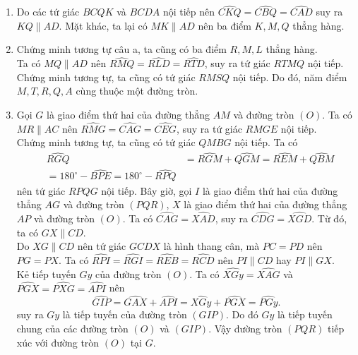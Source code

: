 \begin{ex}
{\begin{center}
		\end{center}
	\begin{enumerate}
		\item Do các tứ giác $BCQK$ và $BCDA$ nội tiếp nên $\widehat{CKQ}=\widehat{CBQ}=\widehat{CAD}$ suy ra $KQ\parallel AD$. Mặt khác, ta lại có $MK\parallel AD$ nên ba điểm $K,M,Q$ thẳng hàng.
		\item Chứng minh tương tự câu a, ta cũng có ba điểm $R,M,L$ thẳng hàng.\\
		Ta có $MQ\parallel AD$ nên $\widehat{RMQ}=\widehat{RLD}=\widehat{RTD}$, suy ra tứ giác $RTMQ$ nội tiếp. \\
		Chứng minh tương tự, ta cũng có tứ giác $RMSQ$ nội tiếp. Do đó, năm điểm $M,T,R,Q,A$ cùng thuộc một đường tròn.
		\item Gọi $G$ là giao điểm thứ hai của đường thẳng $AM$ và đường tròn $(O)$. Ta có $MR\parallel AC$ nên $\widehat{RMG}=\widehat{CAG}=\widehat{CEG}$, suy ra tứ giác $RMGE$ nội tiếp.\\
		Chứng minh tương tự, ta cũng có tứ giác $QMBG$ nội tiếp. Ta có
		\begin{eqnarray*}
	&\widehat{RGQ}&=\widehat{RGM}+\widehat{QGM}=\widehat{REM}+\widehat{QBM}\\
	&=180^\circ-\widehat{BPE}=180^\circ-\widehat{RPQ}
		\end{eqnarray*}
	nên tứ giác $RPQG$ nội tiếp. Bây giờ, gọi $I$ là giao điểm thứ hai của đường thẳng $AG$ và đường tròn $(PQR)$, $X$ là giao điểm thứ hai của đường thẳng $AP$ và đường tròn $(O)$. Ta có $\widehat{CAG}=\widehat{XAD}$, suy ra $\widehat{CDG}=\widehat{XGD}$. Từ đó, ta có $GX\parallel CD$.\\
	Do $XG\parallel CD$ nên tứ giác $GCDX$ là hình thang cân, mà $PC=PD$ nên $PG=PX$. Ta có $\widehat{RPI}=\widehat{RGI}=\widehat{REB}=\widehat{RCD}$ nên $PI\parallel CD$ hay $PI\parallel GX$.\\
	Kẻ tiếp tuyến $Gy$ của đường tròn $(O)$. Ta có $\widehat{XGy}=\widehat{XAG}$ và $\widehat{PGX}=\widehat{PXG}=\widehat{API}$ nên
	$$\widehat{GIP}=\widehat{GAX}+\widehat{API}=\widehat{XGy}+\widehat{PGX}=\widehat{PGy}.$$
	suy ra $Gy$ là tiếp tuyến của đường tròn $(GIP)$. Do đó $Gy$ là tiếp tuyến chung của các đường tròn $(O)$ và $(GIP)$. Vậy đường tròn $(PQR)$ tiếp xúc với đường tròn $(O)$ tại $G$.
	\end{enumerate}
	}
\end{ex}
